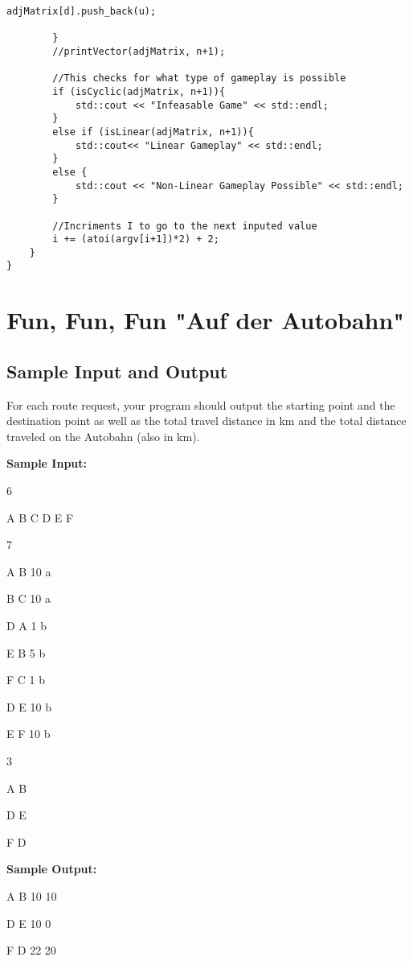 \documentclass[11pt]{article}
\begin{document}
\begin{lstlisting}[frame=single]
            adjMatrix[d].push_back(u);        
                       
        }
        //printVector(adjMatrix, n+1);

        //This checks for what type of gameplay is possible
        if (isCyclic(adjMatrix, n+1)){ 
            std::cout << "Infeasable Game" << std::endl;
        }
        else if (isLinear(adjMatrix, n+1)){
            std::cout<< "Linear Gameplay" << std::endl;
        }
        else {
            std::cout << "Non-Linear Gameplay Possible" << std::endl;
        }
        
        //Incriments I to go to the next inputed value
        i += (atoi(argv[i+1])*2) + 2;
    }
}
\end{lstlisting}
\section{Fun, Fun, Fun "Auf der Autobahn"}  
\subsection{Sample Input and Output}
For each route request, your program should output the starting point and the destination point as well as the total travel distance in km and the total distance traveled on the Autobahn (also in km).
\begin{flushleft}
\textbf{Sample Input:}
\vspace{2mm}
\par
6

A B C D E F

7

A B 10 a

B C 10 a

D A 1 b

E B 5 b

F C 1 b

D E 10 b

E F 10 b

3

A B

D E

F D
\vspace{2mm}
\par
\textbf{Sample Output:}
\par
A B 10 10 

D E 10 0

F D 22 20
\vspace{2mm}
\par
\end{flushleft}
\end{document}
